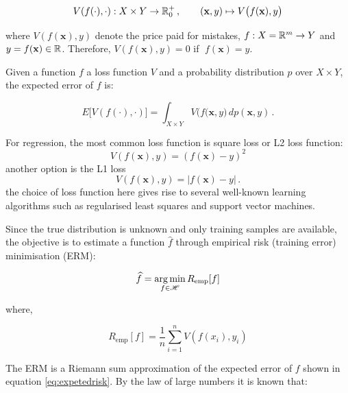\begin{equation}\label{eq:lossfunction}
V(f(\cdot),\cdot):X\times Y\to{\mathbb R }_0^+\,,\qquad
(\mathbf{x},y)\mapsto V\big(f(\mathbf{x}),y\big)
\end{equation}

\noindent where $V(f(\mathbf{x}),y)$ denote the price paid for mistakes, $f:X={\mathbb R }^m\to Y$
and $y=f(\mathbf{x})\in{\mathbb R }$. Therefore, $V(f(\mathbf{x}),y)=0$ if $\;f(\mathbf{x})=y$.

Given a function $f$ a loss function $V$ and a probability distribution $p$ over
$X \times Y$, the expected error of $f$ is:

\begin{equation}
\label{eq:expetedrisk}
E\big[ V( f(\cdot),\cdot) \big]
= \int_{X\times Y} V\big( f(\mathbf{x},y \big)\,dp(\mathbf{x},y)\,.
\end{equation}


For regression, the most common loss function is square loss or L2 loss function:
\begin{equation}
\label{eq:l2loss}
V(f(\mathbf{x}),y) = (f(\mathbf{x})-y)^2
\end{equation}
\noindent another option is the L1 loss
\begin{equation}
\label{eq:l1loss}
V(f(\mathbf{x}),y) = |f(\mathbf{x})-y| \, .
\end{equation}
\noindent the choice of loss function here gives rise to several well-known
learning algorithms such as regularised least squares and support vector
machines. %

Since the true distribution is unknown and only training samples are available,
the objective is to estimate a function $\widehat{f}$ through empirical risk
(training error) minimisation (ERM): 

\begin{equation*}
\widehat{f} = \operatorname*{arg\,min}_{f \in \mathscr{H}} R_{\text{emp}}[f] 
\end{equation*}

\noindent where, 

\begin{equation} 
\label{eq:erm}
R_{\text{emp}}[f] = \frac{1}{n} \sum_{i=1}^n V(f(x_i),y_i)   
\end{equation}

The ERM is a Riemann sum approximation of the expected error of $f$ shown in
equation \ref{eq:expetedrisk}. By the law of large numbers it is known that:

